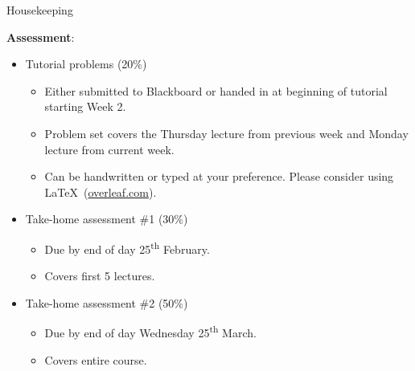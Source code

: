 \documentclass[11pt, xcolor={dvipsnames}, hyperref={colorlinks, allcolors=Blue}]{beamer}
\newcommand\bc[1]{{\usebeamercolor[fg]{frametitle} {\textbf{#1}}}} %
\begin{document}
\begin{frame}{Housekeeping}


\bc{Assessment}:
\begin{itemize}
	\item Tutorial problems (20\%)
	\begin{itemize}
		\item  Either submitted to Blackboard or handed in at beginning of tutorial starting Week 2.
		\item Problem set covers the Thursday lecture from previous week and Monday lecture from current week.
		\item Can be handwritten or typed at your preference. Please consider using \LaTeX \ (\href{https://www.overleaf.com/}{overleaf.com}).
	\end{itemize}

	\item Take-home assessment \#1 (30\%)
	\begin{itemize}
		\item Due by end of day 25\textsuperscript{th} February.
		\item Covers first 5 lectures.
	\end{itemize}
	

	\item Take-home assessment \#2 (50\%)
	\begin{itemize}
		\item Due by end of day Wednesday 25\textsuperscript{th} March.
		\item Covers entire course.
	\end{itemize}
\end{itemize}

\end{frame}
\end{document}
